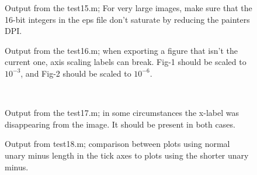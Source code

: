 \documentclass[a4paper,11pt]{article}
\begin{document}
%
\clearpage
%
     \begin{figure}[ht]
       \centering
       \caption{Output from the {\ttfamily test15.m}; For very large images, make sure that the
         16-bit integers in the eps file don't saturate by reducing the painters DPI.}
     \end{figure}
     \begin{figure}[ht]
       \centering
       \quad
       \caption{Output from the {\ttfamily test16.m}; when exporting a figure that isn't the
         current one, axis scaling labels can break. Fig-1 should be scaled to $10^{-3}$, and
         Fig-2 should be scaled to $10^{-6}$.}
     \end{figure}
     \begin{figure}[ht]
       \centering
       \\
       \caption{Output from the {\ttfamily test17.m}; in some circumstances the x-label was
         disappearing from the image. It should be present in both cases.}
     \end{figure}
%
\clearpage
%
  \begin{figure}[ht]
    \centering
    \quad
    \caption{Output from {\ttfamily test18.m}; comparison between plots using normal unary minus length in the tick axes to plots using the shorter unary minus.}
  \end{figure}
\end{document}
